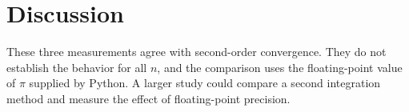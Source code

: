 \documentclass[11pt]{article}
\begin{document}
\section{Discussion}

These three measurements agree with second-order convergence. They do not
establish the behavior for all $n$, and the comparison uses the floating-point
value of $\pi$ supplied by Python. A larger study could compare a second
integration method and measure the effect of floating-point precision.



\end{document}
